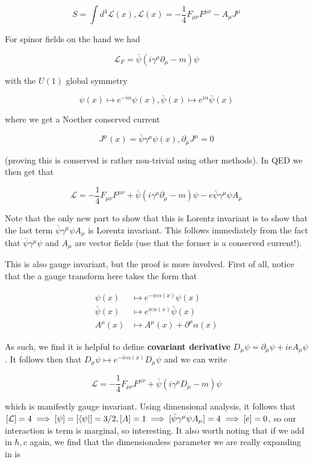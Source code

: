 \documentclass{article}
\theoremstyle{definition}
\begin{document}
$$ S = \int d^4 \mathcal{L}(x), \mathcal{L}(x) = -\frac{1}{4} F_{\mu \nu} F^{\mu
  \nu} - A_\mu J^\mu $$

For spinor fields on the hand we had

$$ \mathcal{L}_F = \bar{\psi} (i \gamma^\mu \partial_\mu - m) \psi $$

with the $U(1)$ global symmetry

$$ \psi(x) \mapsto e^{-i \alpha} \psi(x), \bar{\psi}(x) \mapsto e^{i \alpha}
\bar{\psi}(x) $$

where we get a Noether conserved current

$$ J^\mu(x) = \bar{\psi} \gamma^\mu \psi(x), \partial_\mu J^\mu = 0 $$

(proving this is conserved is rather non-trivial using other methods). In QED we
then get that

$$ \mathcal{L} = -\frac{1}{4} F_{\mu \nu} F^{\mu \nu} + \bar{\psi} (i \gamma^\mu
\partial_\mu - m) \psi - e \bar{\psi} \gamma^\mu \psi A_\mu $$

Note that the only new part to show that this is Lorentz invariant is to show
that the last term $\bar{\psi} \gamma^\mu \psi A_\mu$ is Lorentz invariant. This
follows immediately from the fact that $\bar{\psi} \gamma^\mu \psi$ and $A_\mu$
are vector fields (use that the former is a conserved current!).

This is also gauge invariant, but the proof is more involved. First of all,
notice that the a gauge transform here takes the form that

\begin{align*}
  \psi(x) &\mapsto e^{-i e \alpha(x)} \psi(x) \\
  \bar{\psi}(x) &\mapsto  e^{i e \alpha(x)} \bar{\psi}(x) \\
  A^\mu(x) &\mapsto A^\mu(x) + \partial^\mu \alpha(x)
\end{align*}

As such, we find it is helpful to define \textbf{covariant derivative} $D_\mu
\psi = \partial_\mu \psi + ie A_\mu \psi$. It follows then that $D_\mu \psi
\mapsto e^{-ie\alpha(x)} D_\mu \psi$ and we can write

$$ \mathcal{L} = -\frac{1}{4} F_{\mu \nu} F^{\mu \nu} + \bar{\psi}(i \gamma^\mu
D_\mu - m ) \psi $$

which is manifestly gauge invariant. Using dimensional analysis, it follows that
$[\mathcal{L}] = 4 \implies [\psi] = [\bra{\psi}] = 3/2, [A] = 1 \implies
[\bar{\psi} \gamma^\mu \psi A_\mu] = 4 \implies [e] = 0$, so our interaction is
term is marginal, so interesting. It also worth noting that if we add in $\hbar,
c$ again, we find that the dimensionaless parameter we are really expanding in
is
\end{document}

